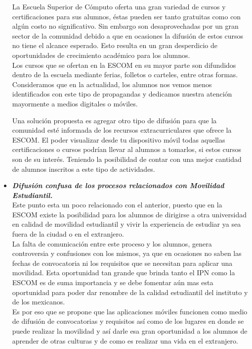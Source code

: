 \begin{itemize}
		La Escuela Superior de Cómputo oferta una gran variedad de cursos y certificaciones para sus alumnos, éstas pueden ser tanto gratuitas como con algún costo no significativo. Sin embargo son desaprovechadas por un gran sector de la comunidad debido a que en ocasiones la difusión de estos cursos no tiene el alcance esperado. Esto resulta en un gran desperdicio de oportunidades de crecimiento académico para los alumnos.\\
		
		Los cursos que se ofertan en la ESCOM en su mayor parte son difundidos dentro de la escuela mediante ferias, folletos o carteles, entre otras formas. Consideramos que en la actualidad, los alumnos nos vemos menos identificados con este tipo de propagandas y dedicamos nuestra atención mayormente a medios digitales o móviles.
		
		Una solución propuesta es agregar otro tipo de difusión para que la comunidad esté informada de los recursos extracurriculares que ofrece la ESCOM. El poder visualizar desde tu dispositivo móvil todas aquellas certificaciones o cursos podrían llevar al alumnos a tomarlos, si estos cursos son de su interés. Teniendo la posibilidad de contar con una mejor cantidad de alumnos inscritos a este tipo de actividades.\\ 
		
		
		
		\item \textbf{\textit{Difusión confusa de los procesos relacionados con Movilidad Estudiantil.}}\\
		
		Este punto esta un poco relacionado con el anterior, puesto que en la ESCOM existe la posibilidad para los alumnos de dirigirse a otra universidad en calidad de movilidad estudiantil y vivir la experiencia de estudiar ya sea fuera de la ciudad o en el extranjero. \\
		
		La falta de comunicación entre este proceso y los alumnos, genera controversia y confusiones con los mismos, ya que en ocasiones no saben las fechas de convocatoria ni los requisitos que se necesitan para aplicar una movilidad. Esta oportunidad tan grande que brinda tanto el IPN como la ESCOM es de suma importancia y se debe fomentar aún mas esta oportunidad para poder dar renombre de la calidad estudiantil del instituto y de los mexicanos.\\
		
		Es por eso que se propone que las aplicaciones móviles funcionen como medio de difusión de convocatorias y requisitos así como de los lugares en donde se puede realizar la movilidad y así darle esa gran oportunidad a los alumnos de aprender de otras culturas y de como es realizar una vida en el extranjero.\\
		
	\end{itemize}
	
